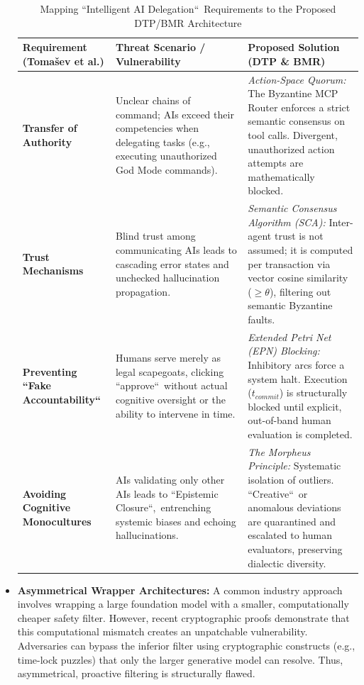 \documentclass[a4paper,11pt,twocolumn]{article}
\theoremstyle{definition}
\theoremstyle{plain}
\begin{document}
\begin{itemize}
\begin{table}[ht]
\centering
\caption{Mapping “Intelligent AI Delegation“\ Requirements \cite{tomasev2026intelligent} to the Proposed DTP/BMR Architecture}
\label{tab:delegation_comparison}
\renewcommand{\arraystretch}{1.3}
\begin{tabularx}{\textwidth}{@{}p{4cm}XX@{}}
\toprule
\textbf{Requirement (Toma{\v{s}}ev et al.)} & \textbf{Threat Scenario / Vulnerability} & \textbf{Proposed Solution (DTP \& BMR)} \\ 
\midrule
\textbf{Transfer of Authority} & Unclear chains of command; AIs exceed their competencies when delegating tasks (e.g., executing unauthorized God Mode commands). & \textit{Action-Space Quorum:} The Byzantine MCP Router enforces a strict semantic consensus on tool calls. Divergent, unauthorized action attempts are mathematically blocked. \\ 
\textbf{Trust Mechanisms} & Blind trust among communicating AIs leads to cascading error states and unchecked hallucination propagation. & \textit{Semantic Consensus Algorithm (SCA):} Inter-agent trust is not assumed; it is computed per transaction via vector cosine similarity ($\ge \theta$), filtering out semantic Byzantine faults. \\ 
\textbf{Preventing “Fake Accountability“} & Humans serve merely as legal scapegoats, clicking “approve“\ without actual cognitive oversight or the ability to intervene in time. & \textit{Extended Petri Net (EPN) Blocking:} Inhibitory arcs force a system halt. Execution ($t_{commit}$) is structurally blocked until explicit, out-of-band human evaluation is completed. \\ 
\textbf{Avoiding Cognitive Monocultures} & AIs validating only other AIs leads to “Epistemic Closure“,\ entrenching systemic biases and echoing hallucinations. & \textit{The Morpheus Principle:} Systematic isolation of outliers. “Creative“\ or anomalous deviations are quarantined and escalated to human evaluators, preserving dialectic diversity. \\ 
\bottomrule
\end{tabularx}
\end{table}
    
    \item \textbf{Asymmetrical Wrapper Architectures:} A common industry approach involves wrapping a large foundation model with a smaller, computationally cheaper safety filter.
    However, recent cryptographic proofs \cite{goldwasser2025holes} demonstrate that this computational mismatch creates an unpatchable vulnerability. Adversaries can bypass the inferior filter using cryptographic constructs (e.g., time-lock puzzles) that only the larger generative model can resolve.
    Thus, asymmetrical, proactive filtering is structurally flawed.


\end{itemize}
\end{document}
